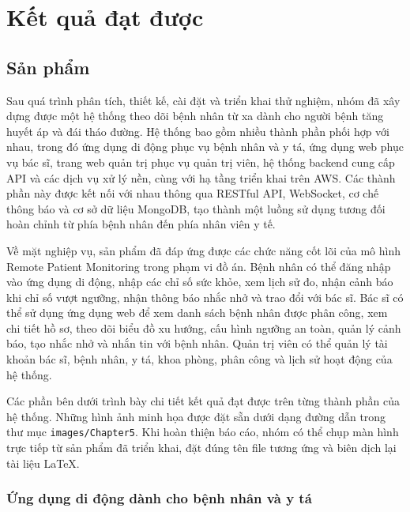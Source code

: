 \chapter{Kết quả đạt được}
\label{Chapter5}

\section{Sản phẩm}

\par Sau quá trình phân tích, thiết kế, cài đặt và triển khai thử nghiệm, nhóm đã xây dựng được một hệ thống theo dõi bệnh nhân từ xa dành cho người bệnh tăng huyết áp và đái tháo đường. Hệ thống bao gồm nhiều thành phần phối hợp với nhau, trong đó ứng dụng di động phục vụ bệnh nhân và y tá, ứng dụng web phục vụ bác sĩ, trang web quản trị phục vụ quản trị viên, hệ thống backend cung cấp API và các dịch vụ xử lý nền, cùng với hạ tầng triển khai trên AWS. Các thành phần này được kết nối với nhau thông qua RESTful API, WebSocket, cơ chế thông báo và cơ sở dữ liệu MongoDB, tạo thành một luồng sử dụng tương đối hoàn chỉnh từ phía bệnh nhân đến phía nhân viên y tế.

\par Về mặt nghiệp vụ, sản phẩm đã đáp ứng được các chức năng cốt lõi của mô hình Remote Patient Monitoring trong phạm vi đồ án. Bệnh nhân có thể đăng nhập vào ứng dụng di động, nhập các chỉ số sức khỏe, xem lịch sử đo, nhận cảnh báo khi chỉ số vượt ngưỡng, nhận thông báo nhắc nhở và trao đổi với bác sĩ. Bác sĩ có thể sử dụng ứng dụng web để xem danh sách bệnh nhân được phân công, xem chi tiết hồ sơ, theo dõi biểu đồ xu hướng, cấu hình ngưỡng an toàn, quản lý cảnh báo, tạo nhắc nhở và nhắn tin với bệnh nhân. Quản trị viên có thể quản lý tài khoản bác sĩ, bệnh nhân, y tá, khoa phòng, phân công và lịch sử hoạt động của hệ thống.

\par Các phần bên dưới trình bày chi tiết kết quả đạt được trên từng thành phần của hệ thống. Những hình ảnh minh họa được đặt sẵn dưới dạng đường dẫn trong thư mục \texttt{images/Chapter5}. Khi hoàn thiện báo cáo, nhóm có thể chụp màn hình trực tiếp từ sản phẩm đã triển khai, đặt đúng tên file tương ứng và biên dịch lại tài liệu LaTeX.

\subsection{Ứng dụng di động dành cho bệnh nhân và y tá}

